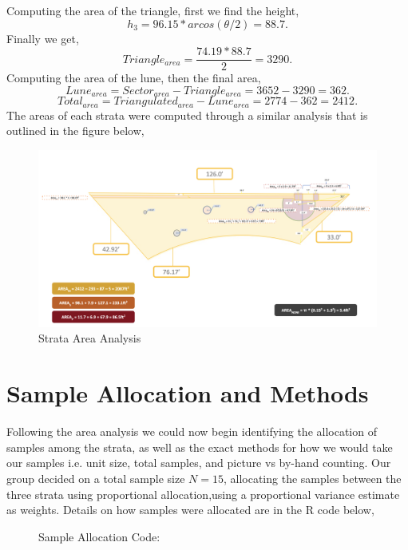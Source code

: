 \documentclass[12pt]{amsart}
\begin{document}
Computing the area of the triangle, first we find the height, 
\begin{equation*}
    h_3 = 96.15 * arcos(\theta/2) = 88.7.
\end{equation*}
Finally we get,
\begin{equation*}
    Triangle_{area} = \dfrac{74.19*88.7}{2} = 3290.
\end{equation*}
Computing the area of the lune, then the final area, 
\begin{equation*}
    Lune_{area} = Sector_{area} - Triangle_{area} = 3652 - 3290 = 362.
\end{equation*}
\begin{equation*}
    Total_{area} = Triangulated_{area} - Lune_{area} = 2774 -362 = 2412.  
\end{equation*}
The areas of each strata were computed through a similar analysis that is outlined in the figure below, 
\begin{figure}[H]
    \begin{center}
    \caption{Strata Area Analysis}
    \includegraphics[width= \linewidth]{fig3.png}
    \end{center}
    \end{figure}

\section{Sample Allocation and Methods}
Following the area analysis we could now begin identifying the allocation of samples among the strata, as well as the exact methods for how we 
would take our samples i.e. unit size, total samples, and picture vs by-hand counting. Our group decided on a total sample size $N = 15$, allocating the 
samples between the three strata using proportional allocation,using a proportional variance estimate as weights. Details on how samples were allocated 
are in the R code below, \\
\begin{figure}[H]
    \begin{center}
        \caption{Sample Allocation Code:}
        
        \end{center} 
    \end{figure}
\end{document}
